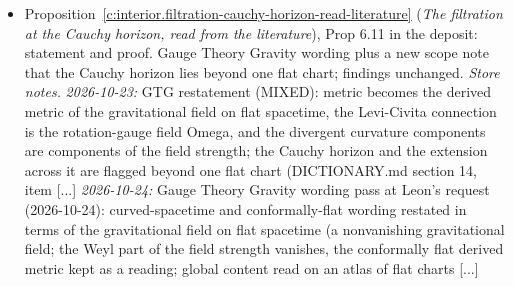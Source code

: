 \documentclass[11pt]{article}
\theoremstyle{definition}
\theoremstyle{plain}
\begin{document}
\begin{itemize}
\item Proposition~\ref{c:interior.filtration-cauchy-horizon-read-literature} (\emph{The filtration at the Cauchy horizon, read from the literature}), Prop 6.11 in the deposit: statement and proof. Gauge Theory Gravity wording plus a new scope note that the Cauchy horizon lies beyond one flat chart; findings unchanged. \emph{Store notes.} \emph{2026-10-23:} GTG restatement (MIXED): metric becomes the derived metric of the gravitational field on flat spacetime, the Levi-Civita connection is the rotation-gauge field Omega, and the divergent curvature components are components of the field strength; the Cauchy horizon and the extension across it are flagged beyond one flat chart (DICTIONARY.md section 14, item [...] \emph{2026-10-24:} Gauge Theory Gravity wording pass at Leon's request (2026-10-24): curved-spacetime and conformally-flat wording restated in terms of the gravitational field on flat spacetime (a nonvanishing gravitational field; the Weyl part of the field strength vanishes, the conformally flat derived metric kept as a reading; global content read on an atlas of flat charts [...]
\end{itemize}
\end{document}
